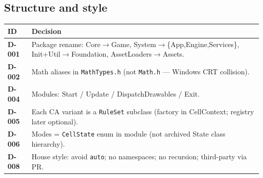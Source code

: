 \documentclass[10pt,a4paper]{article}
\begin{document}
\subsection{Structure and style}
\begin{table}[h!]
\centering
\small
\begin{tabularx}{\textwidth}{l X}
\toprule
\textbf{ID} & \textbf{Decision} \\
\midrule
\textbf{D-001} & Package rename: Core$\rightarrow$Game, System$\rightarrow$\{App,Engine,Services\}, Init+Util$\rightarrow$Foundation, AssetLoaders$\rightarrow$Assets. \\
\textbf{D-002} & Math aliases in \texttt{MathTypes.h} (not \texttt{Math.h} --- Windows CRT collision). \\
\textbf{D-004} & Modules: Start / Update / DispatchDrawables / Exit. \\
\textbf{D-005} & Each CA variant is a \texttt{RuleSet} subclass (factory in CellContext; registry later optional). \\
\textbf{D-006} & Modes = \texttt{CellState} enum in module (not archived State class hierarchy). \\
\textbf{D-008} & House style: avoid \texttt{auto}; no namespaces; no recursion; third-party via PR. \\
\bottomrule
\end{tabularx}
\end{table}
\end{document}
